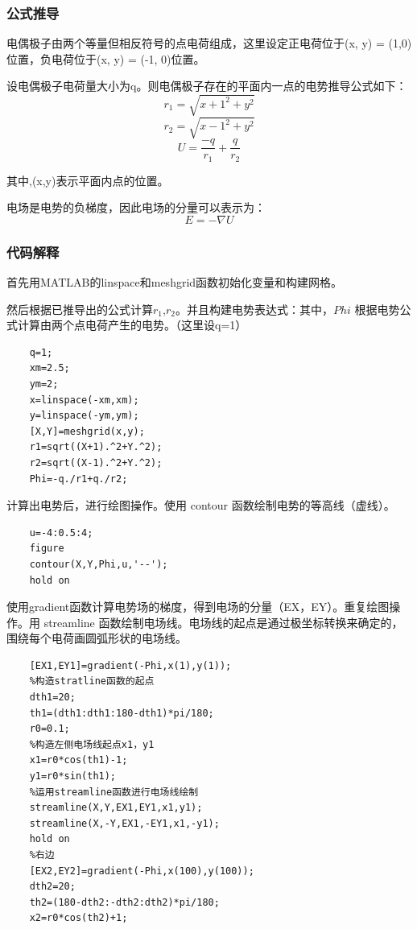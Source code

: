 \documentclass[UTF8]{article}
\numberwithin{figure}{subsection}
\numberwithin{table}{subsection}
\begin{document}
\begin{multicols}{2}
    \subsubsection{公式推导}
    \par 电偶极子由两个等量但相反符号的点电荷组成，这里设定正电荷位于(x, y) = (1,0)位置，负电荷位于(x, y) = (-1, 0)位置。
    \par 设电偶极子电荷量大小为q。则电偶极子存在的平面内一点的电势推导公式如下：
    $$r_1=\sqrt{{x+1}^2+y^2}$$
    $$r_2=\sqrt{{x-1}^2+y^2}$$
    $$U=\frac{-q}{r_1}+\frac{q}{r_2}$$
    \par 其中,(x,y)表示平面内点的位置。
    \par 电场是电势的负梯度，因此电场的分量可以表示为：
    $$E=-\nabla U$$
    \subsubsection{代码解释}
    \par 首先用MATLAB的linspace和meshgrid函数初始化变量和构建网格。
    \par 然后根据已推导出的公式计算$r_1$,$r_2$。并且构建电势表达式：其中，$Phi$ 根据电势公式计算由两个点电荷产生的电势。（这里设q=1）
    \begin{lstlisting}
    q=1;
    xm=2.5;
    ym=2;
    x=linspace(-xm,xm);
    y=linspace(-ym,ym);
    [X,Y]=meshgrid(x,y);
    r1=sqrt((X+1).^2+Y.^2);
    r2=sqrt((X-1).^2+Y.^2);
    Phi=-q./r1+q./r2;
    \end{lstlisting}
    \par 计算出电势后，进行绘图操作。使用 contour 函数绘制电势的等高线（虚线）。
    \begin{lstlisting}
    u=-4:0.5:4;
    figure
    contour(X,Y,Phi,u,'--');
    hold on
    \end{lstlisting}
    \par 使用gradient函数计算电势场的梯度，得到电场的分量（EX，EY）。重复绘图操作。用 streamline 函数绘制电场线。电场线的起点是通过极坐标转换来确定的，围绕每个电荷画圆弧形状的电场线。
    \begin{lstlisting}
    [EX1,EY1]=gradient(-Phi,x(1),y(1));
    %构造stratline函数的起点
    dth1=20;
    th1=(dth1:dth1:180-dth1)*pi/180;
    r0=0.1;
    %构造左侧电场线起点x1，y1
    x1=r0*cos(th1)-1;
    y1=r0*sin(th1);
    %运用streamline函数进行电场线绘制
    streamline(X,Y,EX1,EY1,x1,y1);
    streamline(X,-Y,EX1,-EY1,x1,-y1);
    hold on 
    %右边
    [EX2,EY2]=gradient(-Phi,x(100),y(100));
    dth2=20;
    th2=(180-dth2:-dth2:dth2)*pi/180;
    x2=r0*cos(th2)+1;

\end{lstlisting}
\end{multicols}
\end{document}
